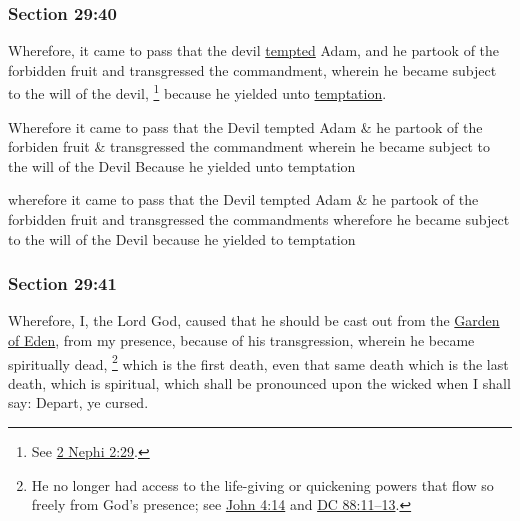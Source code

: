 	\subsubsection{Section 29:40} %
		\label{DC29-40}

		Wherefore, it came to pass that the devil \hyperref[TEMPTATION]{tempted} Adam, and he partook of the forbidden fruit and transgressed the commandment, wherein he became subject to the will of the devil,%
			\footnote{%
				See \hyperref[2NEPHI-2-29]{2 Nephi 2:29}.
				}
		because he yielded unto \hyperref[TEMPTATION]{temptation}.

		\begin{framed}
		\scriptsize
			\begin{compactdesc}
				\item[JSP] Wherefore it came to pass that the Devil tempted Adam \& he partook of the forbiden fruit \& transgressed the commandment wherein he became subject to the will of the Devil Because he yielded unto temptation
				\item[HSN] wherefore it came to pass that the Devil tempted Adam \& he partook of the forbidden fruit and transgressed the commandments wherefore he became subject to the will of the Devil because he yielded to temptation
			\end{compactdesc}
		\end{framed}

	\subsubsection{Section 29:41} %
		\label{DC29-41}

		Wherefore, I, the Lord God, caused that he should be cast out from the \hyperref[GARDENOFEDEN]{Garden of Eden}, from my presence, because of his transgression, wherein he became spiritually dead,%
			\footnote{%
				He no longer had access to the life-giving or quickening powers that flow so freely from God's presence; see \hyperref[JOHN-4-14]{John 4:14} and \hyperref[DC88-11]{DC 88:11--13}.
				}
		which is the first death, even that same death which is the last death, which is spiritual, which shall be pronounced upon the wicked when I shall say: Depart, ye cursed.

